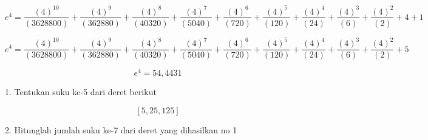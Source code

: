 \documentclass[a4paper,10pt]{article}
\begin{document}
\begin{eulernotebook}
\begin{eulercomment}
\begin{eulercomment}
\begin{eulercomment}
\begin{eulercomment}
\begin{eulercomment}
\begin{eulercomment}
\begin{eulercomment}
\begin{eulercomment}
\begin{eulercomment}
\begin{eulercomment}
\begin{eulercomment}
\begin{eulercomment}
\begin{eulercomment}
\begin{eulercomment}
\begin{eulercomment}
\begin{eulercomment}
\begin{eulercomment}
\begin{eulercomment}
\begin{eulercomment}
\begin{eulercomment}
\begin{eulercomment}
\begin{eulercomment}
\begin{eulercomment}
\begin{eulercomment}
\begin{eulercomment}
\begin{eulercomment}
\begin{eulercomment}
\begin{eulercomment}
\begin{eulercomment}
\end{eulercomment}
\begin{eulerformula}
\[
e^4 = \frac{(4)^{10}}{(3628800)} + \frac{(4)^{9}}{(362880)} + \frac{(4)^{8}}{(40320)} + \frac{(4)^{7}}{(5040)} + \frac{(4)^{6}}{(720)} + \frac{(4)^{5}}{(120)} + \frac{(4)^{4}}{(24)} + \frac{(4)^{3}}{(6)} + \frac{(4)^{2}}{(2)} + 4 + 1
\]
\end{eulerformula}
\begin{eulercomment}
\end{eulercomment}
\begin{eulerformula}
\[
e^4 = \frac{(4)^{10}}{(3628800)} + \frac{(4)^{9}}{(362880)} + \frac{(4)^{8}}{(40320)} + \frac{(4)^{7}}{(5040)} + \frac{(4)^{6}}{(720)} + \frac{(4)^{5}}{(120)} + \frac{(4)^{4}}{(24)} + \frac{(4)^{3}}{(6)} + \frac{(4)^{2}}{(2)} + 5
\]
\end{eulerformula}
\begin{eulercomment}
\end{eulercomment}
\begin{eulerformula}
\[
e^4 = 54,4431
\]
\end{eulerformula}
\begin{eulercomment}
\begin{eulercomment}
\begin{eulercomment}
1. Tentukan suku ke-5 dari deret berikut\\
\end{eulercomment}
\begin{eulerformula}
\[
[5, 25, 125]
\]
\end{eulerformula}
\begin{eulercomment}
2. Hitunglah jumlah suku ke-7 dari deret yang dihasilkan no 1


\end{eulercomment}
\end{eulercomment}
\end{eulercomment}
\end{eulercomment}
\end{eulercomment}
\end{eulercomment}
\end{eulercomment}
\end{eulercomment}
\end{eulercomment}
\end{eulercomment}
\end{eulercomment}
\end{eulercomment}
\end{eulercomment}
\end{eulercomment}
\end{eulercomment}
\end{eulercomment}
\end{eulercomment}
\end{eulercomment}
\end{eulercomment}
\end{eulercomment}
\end{eulercomment}
\end{eulercomment}
\end{eulercomment}
\end{eulercomment}
\end{eulercomment}
\end{eulercomment}
\end{eulercomment}
\end{eulercomment}
\end{eulercomment}
\end{eulercomment}
\end{eulercomment}
\end{eulernotebook}
\end{document}
